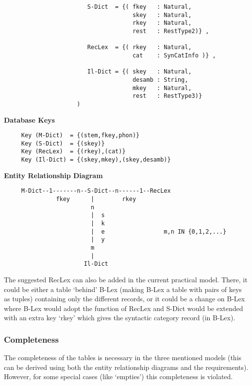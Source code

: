 \begin{description}
\begin{verbatim}
                        S-Dict  = {( fkey   : Natural,
                                     skey   : Natural,
                                     rkey   : Natural,
                                     rest   : RestType2)} ,
           
                        RecLex  = {( rkey   : Natural,
                                     cat    : SynCatInfo )} ,
                
                        Il-Dict = {( skey   : Natural,
                                     desamb : String,
                                     mkey   : Natural,
                                     rest   : RestType3)}
                     )
\end{verbatim}         
{\bf Database Keys}
\begin{verbatim}
     Key (M-Dict)  = {(stem,fkey,phon)}
     Key (S-Dict)  = {(skey)}
     Key (RecLex)  = {(rkey),(cat)}
     Key (Il-Dict) = {(skey,mkey),(skey,desamb)}
\end{verbatim}           
{\bf Entity Relationship Diagram}
\begin{verbatim}           
     M-Dict--1-------n--S-Dict--n------1--RecLex
               fkey      |        rkey
                         n
                         |  s
                         |  k
                         |  e                 m,n IN {0,1,2,...}
                         |  y
                         m
                         |
                       Il-Dict
\end{verbatim} 
     
        The suggested RecLex can also be added in the current practical model.
        There, it could be either a table `behind' B-Lex (making B-Lex a table
        with pairs of keys as tuples) containing only the different records, 
        or it could be a change on B-Lex where B-Lex would adopt the function of
        RecLex and S-Dict would be extended with an extra key `rkey' which 
        gives the syntactic category record (in B-Lex).
\end{description}
 
\subsubsection{Completeness}
The completeness of the tables is necessary in the three mentioned models 
(this can be derived using both the entity relationship diagrams and the 
requirements). However, for some special cases (like `empties') this 
completeness is violated. 
 
